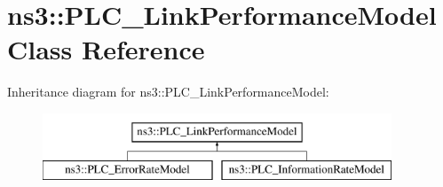 \hypertarget{classns3_1_1PLC__LinkPerformanceModel}{\section{ns3\-:\-:\-P\-L\-C\-\_\-\-Link\-Performance\-Model \-Class \-Reference}
\label{classns3_1_1PLC__LinkPerformanceModel}
}
\-Inheritance diagram for ns3\-:\-:\-P\-L\-C\-\_\-\-Link\-Performance\-Model\-:\begin{figure}[H]
\begin{center}
\leavevmode
\includegraphics[height=2.000000cm]{classns3_1_1PLC__LinkPerformanceModel}
\end{center}
\end{figure}
